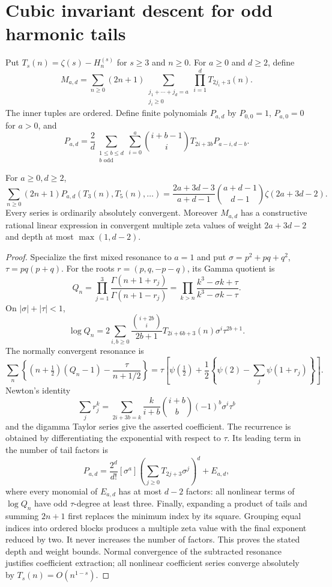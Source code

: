 \section{Cubic invariant descent for odd harmonic tails}
\label{cti:section}
Put $T_s(n)=\zeta(s)-H_n^{(s)}$ for $s\ge3$ and $n\ge0$.
For $a\ge0$ and $d\ge2$, define
\[
 M_{a,d}=\sum_{n\ge0}(2n+1)
   \sum_{\substack{j_1+\cdots+j_d=a\\j_i\ge0}}
       \prod_{i=1}^dT_{2j_i+3}(n).
\]
The inner tuples are ordered. Define finite polynomials $P_{a,d}$ by
$P_{0,0}=1$, $P_{a,0}=0$ for $a>0$, and
\[
 P_{a,d}=\frac2d\sum_{\substack{1\le b\le d\\b\text{ odd}}}
    \sum_{i=0}^a\binom{i+b-1}{i}T_{2i+3b}P_{a-i,d-b}.
\]
\begin{theorem}\label{cti:coefficients}
For $a\ge0,d\ge2$,
\[
 \sum_{n\ge0}(2n+1)P_{a,d}(T_3(n),T_5(n),\ldots)
 =\frac{2a+3d-3}{a+d-1}\binom{a+d-1}{d-1}\zeta(2a+3d-2).
\]
Every series is ordinarily absolutely convergent. Moreover $M_{a,d}$
has a constructive rational linear expression in convergent multiple zeta
values of weight $2a+3d-2$ and depth at most $\max(1,d-2)$.
\end{theorem}
\begin{proof}
Specialize the first mixed resonance to $a=1$ and put
$\sigma=p^2+pq+q^2$, $\tau=pq(p+q)$.
For the roots $r=(p,q,-p-q)$, its Gamma quotient is
\[
 Q_n=\prod_{j=1}^3\frac{\Gamma(n+1+r_j)}{\Gamma(n+1-r_j)}
     =\prod_{k>n}\frac{k^3-\sigma k+\tau}{k^3-\sigma k-\tau}.
\]
On $|\sigma|+|\tau|<1$,
\[
 \log Q_n=2\sum_{i,b\ge0}\frac{\binom{i+2b}{i}}{2b+1}
   T_{2i+6b+3}(n)\sigma^i\tau^{2b+1}.
\]
The normally convergent resonance is
\[
 \sum_n\left\{(n+\tfrac12)(Q_n-1)-\frac\tau{n+1/2}\right\}
 =\tau\left[\psi(\tfrac12)+\frac12\left\{\psi(2)-\sum_j\psi(1+r_j)\right\}\right].
\]
Newton's identity
\[
 \sum_jr_j^k=\sum_{2i+3b=k}
   \frac{k}{i+b}\binom{i+b}{b}(-1)^b\sigma^i\tau^b
\]
and the digamma Taylor series give the asserted coefficient. The recurrence
is obtained by differentiating the exponential with respect to $\tau$.
Its leading term in the number of tail factors is
\[
 P_{a,d}=\frac{2^d}{d!}[\sigma^a]
       \left(\sum_{j\ge0}T_{2j+3}\sigma^j\right)^d+E_{a,d},
\]
where every monomial of $E_{a,d}$ has at most $d-2$ factors: all nonlinear
terms of $\log Q_n$ have odd $\tau$-degree at least three.
Finally, expanding a product of tails and summing $2n+1$ first replaces
the minimum index by its square. Grouping equal indices into ordered
blocks produces a multiple zeta value with the final exponent reduced by
two. It never increases the number of factors. This proves the stated
depth and weight bounds. Normal convergence of the subtracted resonance
justifies coefficient extraction; all nonlinear coefficient series converge
absolutely by $T_s(n)=O(n^{1-s})$.
\end{proof}

